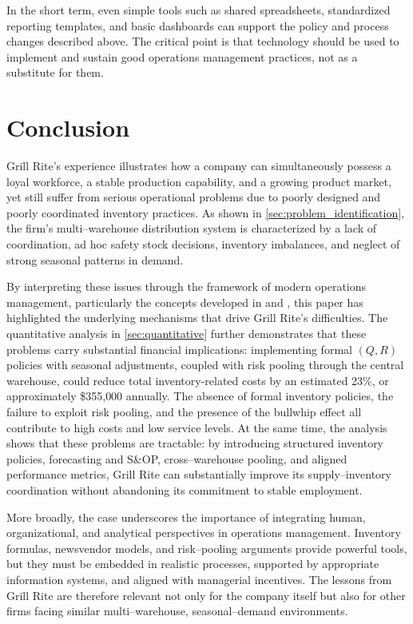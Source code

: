 \documentclass[12pt,a4paper]{article}
\begin{document}
In the short term, even simple tools such as shared spreadsheets, standardized reporting templates, and basic dashboards can support the policy and process changes described above. The critical point is that technology should be used to implement and sustain good operations management practices, not as a substitute for them.

\section{Conclusion}
\label{sec:conclusion}

Grill Rite's experience illustrates how a company can simultaneously possess a loyal workforce, a stable production capability, and a growing product market, yet still suffer from serious operational problems due to poorly designed and poorly coordinated inventory practices. As shown in \cref{sec:problem_identification}, the firm’s multi–warehouse distribution system is characterized by a lack of coordination, ad hoc safety stock decisions, inventory imbalances, and neglect of strong seasonal patterns in demand.

By interpreting these issues through the framework of modern operations management, particularly the concepts developed in \citet{stevenson2017operations} and \citet{cachon2018matching}, this paper has highlighted the underlying mechanisms that drive Grill Rite's difficulties. The quantitative analysis in \cref{sec:quantitative} further demonstrates that these problems carry substantial financial implications: implementing formal $(Q,R)$ policies with seasonal adjustments, coupled with risk pooling through the central warehouse, could reduce total inventory-related costs by an estimated 23\%, or approximately \$355{,}000 annually. The absence of formal inventory policies, the failure to exploit risk pooling, and the presence of the bullwhip effect all contribute to high costs and low service levels. At the same time, the analysis shows that these problems are tractable: by introducing structured inventory policies, forecasting and S\&OP, cross–warehouse pooling, and aligned performance metrics, Grill Rite can substantially improve its supply–inventory coordination without abandoning its commitment to stable employment.

More broadly, the case underscores the importance of integrating human, organizational, and analytical perspectives in operations management. Inventory formulas, newsvendor models, and risk–pooling arguments provide powerful tools, but they must be embedded in realistic processes, supported by appropriate information systems, and aligned with managerial incentives. The lessons from Grill Rite are therefore relevant not only for the company itself but also for other firms facing similar multi–warehouse, seasonal–demand environments.
\end{document}
